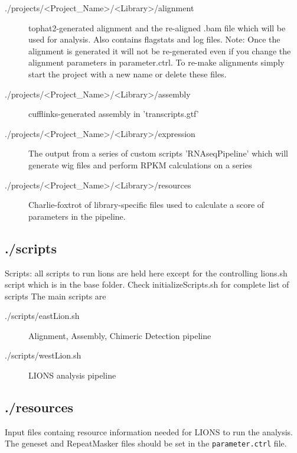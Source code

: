\documentclass[11pt]{scrartcl}
\newcommand{\arrows}[1]{\textless #1\textgreater}
\begin{document}
\begin{description}
\item[./projects/\arrows{Project\_Name}/\arrows{Library}/alignment]
  tophat2-generated alignment and the re-aligned .bam file which
  will be used for analysis. Also contains flagstats and log files.
  Note: Once the alignment is generated it will not be re-generated
  even if you change the alignment parameters in parameter.ctrl. To
  re-make alignments simply start the project with a new name or delete
  these files.

\item[./projects/\arrows{Project\_Name}/\arrows{Library}/assembly]
  cufflinks-generated assembly in 'transcripts.gtf'

\item[./projects/\arrows{Project\_Name}/\arrows{Library}/expression]
  The output from a series of custom scripts 'RNAseqPipeline' which
  will generate wig files and perform RPKM calculations on a series 

\item[./projects/\arrows{Project\_Name}/\arrows{Library}/resources]
  Charlie-foxtrot of library-specific files used to calculate a score
  of parameters in the pipeline.
\end{description}

 \subsection{./scripts}
  Scripts: all scripts to run lions are held here except for the
  controlling lions.sh script which is in the base folder.
  Check initializeScripts.sh for complete list of scripts
  The main scripts are 

\begin{description}
\item[./scripts/eastLion.sh]
    Alignment, Assembly, Chimeric Detection pipeline

\item[./scripts/westLion.sh]
    LIONS analysis pipeline
\end{description}

  \subsection{./resources}
  \label{resources}
  Input files containg resource information needed for LIONS to run the analysis. The geneset and RepeatMasker files should be set in the \texttt{parameter.ctrl} file.
  
\end{document}
